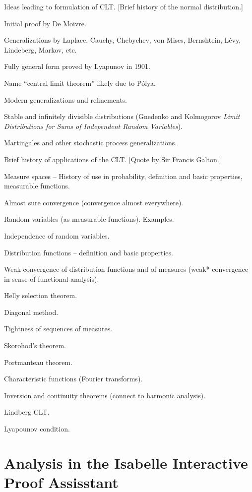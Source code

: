 \documentclass{amsart}
\theoremstyle{definition}
\theoremstyle{remark}
\begin{document}


Ideas leading to formulation of CLT. [Brief history of the normal distribution.]

Initial proof by De Moivre.

Generalizations by Laplace, Cauchy, Chebychev, von Mises, Bernshtein, L\'evy, Lindeberg, Markov, etc.

Fully general form proved by Lyapunov in 1901.

Name ``central limit theorem'' likely due to P\'olya.

Modern generalizations and refinements.

Stable and infinitely divisible distributions (Gnedenko and Kolmogorov {\em Limit Distributions for Sums of Independent Random Variables}).

Martingales and other stochastic process generalizations.

Brief history of applications of the CLT. [Quote by Sir Francis Galton.]


Measure spaces -- History of use in probability, definition and basic properties, measurable functions.

Almost sure convergence (convergence almost everywhere).

Random variables (as measurable functions). Examples.

Independence of random variables.

Distribution functions -- definition and basic properties.

Weak convergence of distribution functions and of measures (weak* convergence in sense of functional analysis).

Helly selection theorem.

Diagonal method.

Tightness of sequences of measures.

Skorohod's theorem.

Portmanteau theorem.

Characteristic functions (Fourier transforms).

Inversion and continuity theorems (connect to harmonic analysis).

Lindberg CLT.

Lyapounov condition.

\section{Analysis in the Isabelle Interactive Proof Assisstant} \label{Isa}
\end{document}
